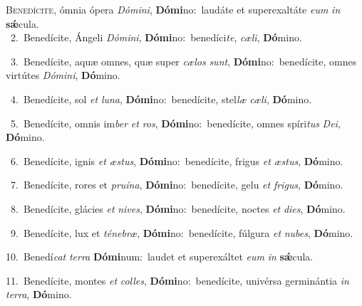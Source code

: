 \lettrine{\initial\textcolor{\initialcolor}{B}}{enedícite,} ómnia ópera \textit{Dó}\-\textit{mi}\textit{ni}, \textbf{Dó}\-\textbf{mi}no:~\star laudáte et superexaltáte \textit{e}\-\textit{um} \textit{in} \textbf{sǽ}\-cula.\\
{\numbfont\textcolor{\numbcolor}{~2.}}~Benedícite, Ángeli \textit{Dó}\-\textit{mi}\textit{ni}, \textbf{Dó}\-\textbf{mi}no:~\star benedíci\-\textit{te}\-, \textit{cæ}\-\textit{li}, \textbf{Dó}\-mino.\par
{\numbfont\textcolor{\numbcolor}{~3.}}~Benedícite, aquæ omnes, quæ super \textit{cæ}\-\textit{los} \textit{sunt}\-, \textbf{Dó}\-\textbf{mi}no:~\star benedícite, omnes virtútes \textit{Dó}\-\textit{mi}\textit{ni}, \textbf{Dó}\-mino.\par
{\numbfont\textcolor{\numbcolor}{~4.}}~Benedícite, sol \textit{et} \textit{lu}\-\textit{na}, \textbf{Dó}\-\textbf{mi}no:~\star benedícite, stel\textit{læ} \textit{cæ}\-\textit{li}, \textbf{Dó}\-mino.\par
{\numbfont\textcolor{\numbcolor}{~5.}}~Benedícite, omnis im\textit{ber} \textit{et} \textit{ros}\-, \textbf{Dó}\-\textbf{mi}no:~\star benedícite, omnes spíri\textit{tus} \textit{De}\-\textit{i}, \textbf{Dó}\-mino.\par
{\numbfont\textcolor{\numbcolor}{~6.}}~Benedícite, ignis \textit{et} \textit{æs}\-\textit{tus}, \textbf{Dó}\-\textbf{mi}no:~\star benedícite, frigus \textit{et} \textit{æs}\-\textit{tus}, \textbf{Dó}\-mino.\par
{\numbfont\textcolor{\numbcolor}{~7.}}~Benedícite, rores et \textit{pru}\-\textit{í}\textit{na}, \textbf{Dó}\-\textbf{mi}no:~\star benedícite, gelu \textit{et} \textit{fri}\-\textit{gus}, \textbf{Dó}\-mino.\par
{\numbfont\textcolor{\numbcolor}{~8.}}~Benedícite, glácies \textit{et} \textit{ni}\-\textit{ves}, \textbf{Dó}\-\textbf{mi}no:~\star benedícite, noctes \textit{et} \textit{di}\-\textit{es}, \textbf{Dó}\-mino.\par
{\numbfont\textcolor{\numbcolor}{~9.}}~Benedícite, lux et \textit{té}\-\textit{ne}\textit{bræ}, \textbf{Dó}\-\textbf{mi}no:~\star benedícite, fúlgura \textit{et} \textit{nu}\-\textit{bes}, \textbf{Dó}\-mino.\par
{\numbfont\textcolor{\numbcolor}{10.}}~Benedí\textit{cat} \textit{ter}\-\textit{ra} \textbf{Dó}\-\textbf{mi}num:~\star laudet et superexáltet \textit{e}\-\textit{um} \textit{in} \textbf{sǽ}\-cula.\par
{\numbfont\textcolor{\numbcolor}{11.}}~Benedícite, montes \textit{et} \textit{col}\-\textit{les}, \textbf{Dó}\-\textbf{mi}no:~\star benedícite, univérsa germinántia \textit{in} \textit{ter}\-\textit{ra}, \textbf{Dó}\-mino.\par
